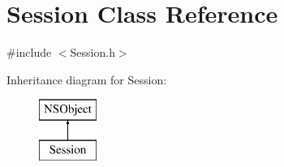 \hypertarget{interface_session}{
\section{\-Session \-Class \-Reference}
\label{interface_session}
}


{\ttfamily \#include $<$\-Session.\-h$>$}

\-Inheritance diagram for \-Session\-:\begin{figure}[H]
\begin{center}
\leavevmode
\includegraphics[height=2.000000cm]{interface_session}
\end{center}
\end{figure}
